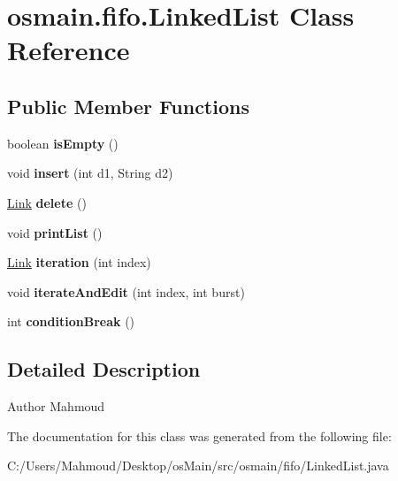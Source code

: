 \hypertarget{classosmain_1_1fifo_1_1_linked_list}{}\section{osmain.\+fifo.\+Linked\+List Class Reference}
\label{classosmain_1_1fifo_1_1_linked_list}
\subsection*{Public Member Functions}
\begin{DoxyCompactItemize}
\item 
boolean {\bfseries is\+Empty} ()\hypertarget{classosmain_1_1fifo_1_1_linked_list_acd26ee3e6462fbc9b5d1bb0104360a9d}{}\label{classosmain_1_1fifo_1_1_linked_list_acd26ee3e6462fbc9b5d1bb0104360a9d}

\item 
void {\bfseries insert} (int d1, String d2)\hypertarget{classosmain_1_1fifo_1_1_linked_list_aaee7ddc715d2dd23a591988880976e5f}{}\label{classosmain_1_1fifo_1_1_linked_list_aaee7ddc715d2dd23a591988880976e5f}

\item 
\hyperlink{classosmain_1_1fifo_1_1_link}{Link} {\bfseries delete} ()\hypertarget{classosmain_1_1fifo_1_1_linked_list_aabc75cabd36892d2132c9e1aa0b702c1}{}\label{classosmain_1_1fifo_1_1_linked_list_aabc75cabd36892d2132c9e1aa0b702c1}

\item 
void {\bfseries print\+List} ()\hypertarget{classosmain_1_1fifo_1_1_linked_list_a60c7e0e8a85445b2418a2767976544a8}{}\label{classosmain_1_1fifo_1_1_linked_list_a60c7e0e8a85445b2418a2767976544a8}

\item 
\hyperlink{classosmain_1_1fifo_1_1_link}{Link} {\bfseries iteration} (int index)\hypertarget{classosmain_1_1fifo_1_1_linked_list_aa0e63e183af8407dd79700e3358a22a9}{}\label{classosmain_1_1fifo_1_1_linked_list_aa0e63e183af8407dd79700e3358a22a9}

\item 
void {\bfseries iterate\+And\+Edit} (int index, int burst)\hypertarget{classosmain_1_1fifo_1_1_linked_list_a3de7838f8f30d77bd3e2bab6581b28cf}{}\label{classosmain_1_1fifo_1_1_linked_list_a3de7838f8f30d77bd3e2bab6581b28cf}

\item 
int {\bfseries condition\+Break} ()\hypertarget{classosmain_1_1fifo_1_1_linked_list_a537f0021cb55f7a3b06a3d016b711c75}{}\label{classosmain_1_1fifo_1_1_linked_list_a537f0021cb55f7a3b06a3d016b711c75}

\end{DoxyCompactItemize}


\subsection{Detailed Description}
\begin{DoxyAuthor}{Author}
Mahmoud 
\end{DoxyAuthor}


The documentation for this class was generated from the following file\+:\begin{DoxyCompactItemize}
\item 
C\+:/\+Users/\+Mahmoud/\+Desktop/os\+Main/src/osmain/fifo/Linked\+List.\+java\end{DoxyCompactItemize}
